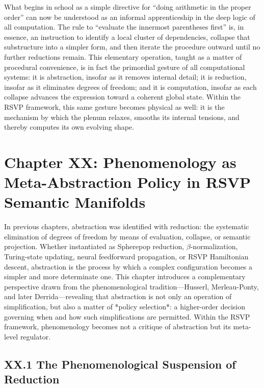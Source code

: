 \documentclass[12pt,letterpaper]{article}
\begin{document}
What begins in school as a simple directive for ``doing arithmetic in the proper
order'' can now be understood as an informal apprenticeship in the deep logic of
all computation.  The rule to ``evaluate the innermost parentheses first'' is, in
essence, an instruction to identify a local cluster of dependencies, collapse
that substructure into a simpler form, and then iterate the procedure outward
until no further reductions remain.  This elementary operation, taught as a
matter of procedural convenience, is in fact the primordial gesture of all
computational systems: it is abstraction, insofar as it removes internal detail;
it is reduction, insofar as it eliminates degrees of freedom; and it is
computation, insofar as each collapse advances the expression toward a coherent
global state.  Within the RSVP framework, this same gesture becomes physical as
well: it is the mechanism by which the plenum relaxes, smooths its internal
tensions, and thereby computes its own evolving shape.

\section{Chapter XX: Phenomenology as Meta-Abstraction Policy in RSVP Semantic Manifolds}

In previous chapters, abstraction was identified with reduction: the systematic
elimination of degrees of freedom by means of evaluation, collapse, or semantic
projection.  Whether instantiated as Spherepop reduction, $\beta$-normalization,
Turing-state updating, neural feedforward propagation, or RSVP Hamiltonian
descent, abstraction is the process by which a complex configuration becomes a
simpler and more determinate one.  This chapter introduces a complementary
perspective drawn from the phenomenological tradition---Husserl, Merleau-Ponty,
and later Derrida---revealing that abstraction is not only an operation of
simplification, but also a matter of *policy selection*: a higher-order decision
governing when and how such simplifications are permitted.  Within the RSVP
framework, phenomenology becomes not a critique of abstraction but its
meta-level regulator.

\subsection{XX.1 The Phenomenological Suspension of Reduction}
\end{document}
